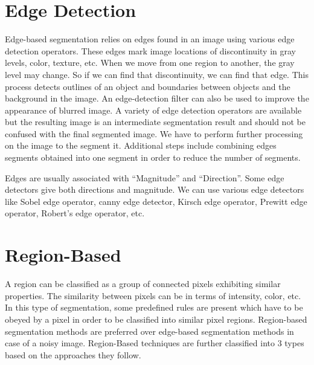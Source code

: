 \section{Edge Detection}

Edge-based segmentation relies on edges found in an image using various edge detection operators. These edges mark image locations of discontinuity in gray levels, color, texture, etc. When we move from one region to another, the gray level may change. So if we can find that discontinuity, we can find that edge. This process detects outlines of an object and boundaries between objects and the background in the
image. An edge-detection filter can also be used to improve the appearance of blurred image. A variety of edge detection operators are available but the resulting image is an intermediate segmentation result and should not be confused with the final segmented image. We have to perform further processing on the image to the segment it. Additional steps include combining edges segments obtained into one segment in order to reduce the number of segments.

Edges are usually associated with “Magnitude” and “Direction”. Some edge detectors give both directions and magnitude. We can use various edge detectors like Sobel edge operator, canny edge detector, Kirsch edge operator, Prewitt edge operator, Robert’s edge operator, etc.

\section{Region-Based}
A region can be classified as a group of connected pixels exhibiting similar properties. The similarity between pixels can be in terms of intensity, color, etc. In this type of segmentation, some predefined rules are present which have to be obeyed by a pixel in order to be classified into similar pixel regions. Region-based segmentation methods are preferred over edge-based segmentation methods in case of a noisy image. Region-Based techniques are further classified into 3 types based on the approaches they follow.

